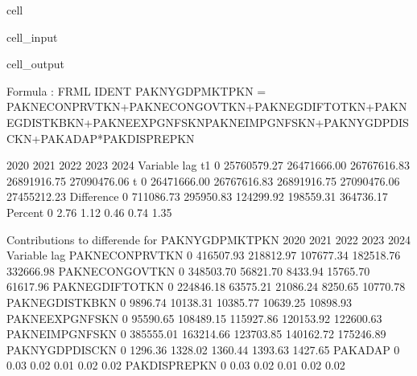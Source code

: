\documentclass[letterpaper,10pt,english]{jupyterBook}
\begin{document}
\begin{sphinxuseclass}{cell}\begin{sphinxVerbatimInput}

\begin{sphinxuseclass}{cell_input}
\begin{sphinxVerbatim}[commandchars=\\\{\}]
 
    \PYG{p}{[}\PYG{p}{]}
\end{sphinxVerbatim}

\end{sphinxuseclass}\end{sphinxVerbatimInput}
\begin{sphinxVerbatimOutput}

\begin{sphinxuseclass}{cell_output}
\begin{sphinxVerbatim}[commandchars=\\\{\}]
Formula        : FRML \PYGZlt{}IDENT\PYGZgt{} PAKNYGDPMKTPKN = PAKNECONPRVTKN+PAKNECONGOVTKN+PAKNEGDIFTOTKN+PAKNEGDISTKBKN+PAKNEEXPGNFSKN\PYGZhy{}PAKNEIMPGNFSKN+PAKNYGDPDISCKN+PAKADAP*PAKDISPREPKN \PYGZdl{} 

                      2020        2021        2022        2023        2024
Variable   lag                                                            
t\PYGZhy{}1        0   25760579.27 26471666.00 26767616.83 26891916.75 27090476.06
t          0   26471666.00 26767616.83 26891916.75 27090476.06 27455212.23
Difference 0     711086.73   295950.83   124299.92   198559.31   364736.17
Percent    0          2.76        1.12        0.46        0.74        1.35

 Contributions to differende for  PAKNYGDPMKTPKN
                         2020       2021       2022       2023       2024
Variable       lag                                                       
PAKNECONPRVTKN 0    416507.93  218812.97  107677.34  182518.76  332666.98
PAKNECONGOVTKN 0    348503.70   56821.70   \PYGZhy{}8433.94   15765.70   61617.96
PAKNEGDIFTOTKN 0    224846.18   63575.21   21086.24    8250.65   10770.78
PAKNEGDISTKBKN 0      9896.74   10138.31   10385.77   10639.25   10898.93
PAKNEEXPGNFSKN 0     95590.65  108489.15  115927.86  120153.92  122600.63
PAKNEIMPGNFSKN 0   \PYGZhy{}385555.01 \PYGZhy{}163214.66 \PYGZhy{}123703.85 \PYGZhy{}140162.72 \PYGZhy{}175246.89
PAKNYGDPDISCKN 0      1296.36    1328.02    1360.44    1393.63    1427.65
PAKADAP        0        \PYGZhy{}0.03      \PYGZhy{}0.02      \PYGZhy{}0.01      \PYGZhy{}0.02      \PYGZhy{}0.02
PAKDISPREPKN   0        \PYGZhy{}0.03      \PYGZhy{}0.02      \PYGZhy{}0.01      \PYGZhy{}0.02      \PYGZhy{}0.02


\end{sphinxVerbatim}
\end{sphinxuseclass}
\end{sphinxVerbatimOutput}
\end{sphinxuseclass}
\end{document}
